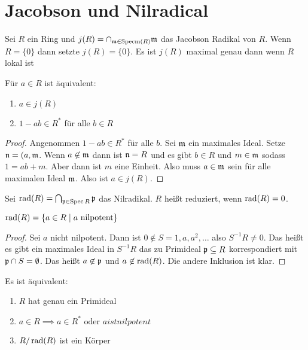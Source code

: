 \section{Jacobson und Nilradical}
\begin{Def}
	Sei \(R\) ein Ring und \(j(R)=\cap_{\mathfrak{m}\in\operatorname{Specm}(R)}\mathfrak{m}\) das Jacobson Radikal von \(R\). 
	Wenn \(R=\{0\}\) dann setzte \(j(R)=\{0\}\).
	Es ist \(j(R)\) maximal genau dann wenn \(R\) lokal ist
\end{Def}
\begin{Bem}
	Für \(a\in R\) ist äquivalent:
	\begin{enumerate}
		\item \(a\in j(R)\)
		\item \(1-ab\in R^*\) für alle \(b\in R\)
	\end{enumerate}
\end{Bem}
\begin{proof}
	Angenommen \(1-ab\in R^{*}\) für alle \(b\). Sei \(\mathfrak{m}\) ein maximales Ideal. Setze \(\mathfrak{n}=(a,\mathfrak{m}\). Wenn \(a\not\in\mathfrak{m}\) dann ist \(\mathfrak{n}=R\) und es gibt \(b\in R\) und \(m\in\mathfrak{m}\) sodass \(1=ab+m\). Aber dann ist \(m\) eine Einheit. Also muss \(a\in\mathfrak{m}\) sein für alle maximalen Ideal \(\mathfrak{m}\). Also ist \(a\in j(R)\).
\end{proof}
\begin{Def}
	Sei \(\operatorname{rad}(R)=\bigcap_{\mathfrak{p}\in \operatorname{Spec} R}\mathfrak{p}\) das Nilradikal. \(R\) heißt reduziert, wenn \(\operatorname{rad}(R)=0\).
\end{Def}
\begin{Satz}
	\(\operatorname{rad}(R)=\{a\in R\mid a \text{ nilpotent}\}\)
\end{Satz}
\begin{proof}
	Sei \(a\) nicht nilpotent. Dann ist \(0\not\in S={1,a,a^2,\dots}\) also \(S^{-1}R\neq 0\).
	Das heißt es gibt ein maximales Ideal in \(S^{-1}R\) das zu Primideal \(\mathfrak{p}\subseteq R\) korrespondiert mit \(\mathfrak{p}\cap S=\emptyset\).
	Das heißt \(a\not\in\mathfrak{p}\) und \(a\not\in \operatorname{rad}(R)\). Die andere Inklusion ist klar.
\end{proof}
\begin{Lemma}
	Es ist äquivalent:
	\begin{enumerate}
		\item \(R\) hat genau ein Primideal
		\item \(a\in R\implies a\in R^* \text{ oder } a ist nilpotent\)
		\item \(R/\operatorname{rad}(R)\) ist ein Körper
	\end{enumerate}
\end{Lemma}
